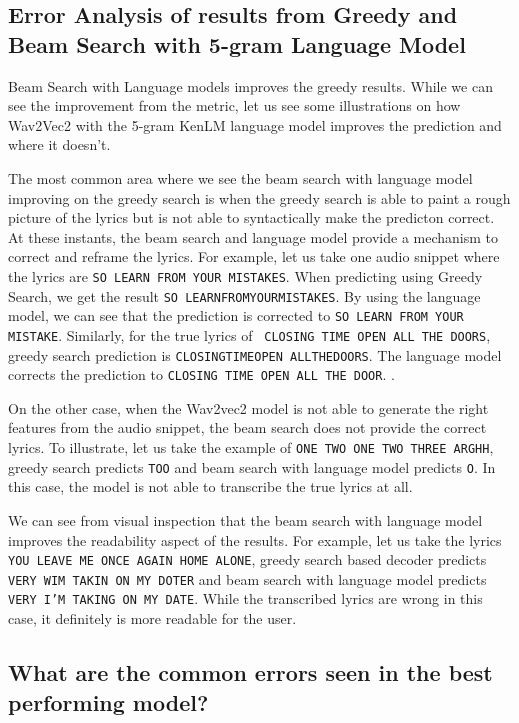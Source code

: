 \subsection{\textbf{ Error Analysis of results from Greedy and Beam Search with 5-gram Language Model}}

Beam Search with Language models improves the greedy results. While we can see the improvement from the metric, let us see some illustrations on how Wav2Vec2 with the 5-gram KenLM language model improves the prediction and where it doesn't.

The most common area where we see the beam search with language model improving on the greedy search is when the greedy search is able to paint a rough picture of the lyrics but is not able to syntactically make the predicton correct. At these instants, the beam search and language model provide a mechanism to correct and reframe the lyrics. For example, let us take one audio snippet where the lyrics are \texttt{SO LEARN FROM YOUR MISTAKES}. When predicting using Greedy Search, we get the result \texttt{SO LEARNFROMYOURMISTAKES}. By using the language model, we can see that the prediction is corrected to \texttt{SO LEARN FROM YOUR MISTAKE}. Similarly, for the true lyrics of \texttt{ CLOSING TIME OPEN ALL THE DOORS}, greedy search prediction is \texttt{CLOSINGTIMEOPEN ALLTHEDOORS}. The language model corrects the prediction to \texttt{CLOSING TIME OPEN ALL THE DOOR}. .

On the other case, when the Wav2vec2 model is not able to generate the right features from the audio snippet, the beam search does not provide the correct lyrics. To illustrate, let us take the example of \texttt{ONE TWO ONE TWO THREE ARGHH}, greedy search predicts \texttt{TOO} and beam search with language model predicts \texttt{O}. In this case, the model is not able to transcribe the true lyrics at all.

We can see from visual inspection that the beam search with language model improves the readability aspect of the results. For example, let us take the lyrics \texttt{YOU LEAVE ME ONCE AGAIN HOME ALONE}, greedy search based decoder predicts \texttt{VERY WIM TAKIN ON MY DOTER} and beam search with language model predicts \texttt{VERY I'M TAKING ON MY DATE}. While the transcribed lyrics are wrong in this case, it definitely is more readable for the user.

\subsection{\textbf{What are the common errors seen in the best performing model?}}

